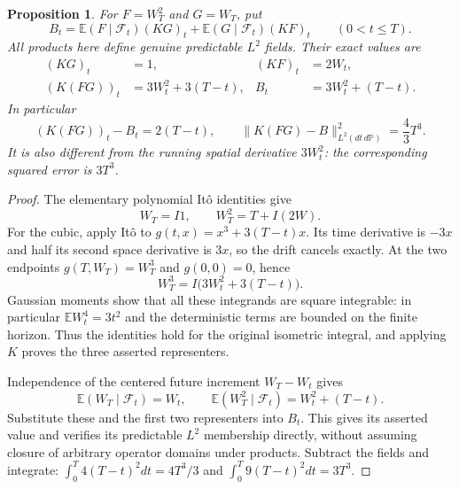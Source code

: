 \documentclass[11pt]{article}
\newtheorem{proposition}[theorem]{Proposition}
\newcommand{\E}{\mathbb E}
\begin{document}
\begin{proposition}\label{prop:conditionalleibniz}
For $F=W_T^2$ and $G=W_T$, put
\[
 B_t=\E(F\mid\mathcal F_t)(KG)_t
       +\E(G\mid\mathcal F_t)(KF)_t\qquad(0<t\leq T).
\]
All products here define genuine predictable $L^2$ fields. Their
exact values are
\begin{align}\label{eq:cubicleibniz}
 (KG)_t&=1,&(KF)_t&=2W_t,\\
 (K(FG))_t&=3W_t^2+3(T-t),& B_t&=3W_t^2+(T-t).
\end{align}
In particular
\begin{equation}\label{eq:cubicleibniznorm}
 (K(FG))_t-B_t=2(T-t),\qquad
 \|K(FG)-B\|_{L^2(dt\,d\mathbb P)}^2=\frac43T^3.
\end{equation}
It is also different from the running spatial derivative $3W_t^2$:
the corresponding squared error is $3T^3$.
\end{proposition}
\begin{proof}
The elementary polynomial It\^o identities give
\[
 W_T=I1,\qquad W_T^2=T+I(2W).
\]
For the cubic, apply It\^o to
$g(t,x)=x^3+3(T-t)x$. Its time derivative is $-3x$ and half its
second space derivative is $3x$, so the drift cancels exactly.
At the two endpoints $g(T,W_T)=W_T^3$ and $g(0,0)=0$, hence
\[
 W_T^3=I\big(3W_t^2+3(T-t)\big).
\]
Gaussian moments show that all these integrands are square
integrable: in particular $\E W_t^4=3t^2$ and the deterministic
terms are bounded on the finite horizon. Thus the identities hold
for the original isometric integral, and applying $K$ proves the
three asserted representers.

Independence of the centered future increment $W_T-W_t$ gives
\[
 \E(W_T\mid\mathcal F_t)=W_t,\qquad
 \E(W_T^2\mid\mathcal F_t)=W_t^2+(T-t).
\]
Substitute these and the first two representers into $B_t$.
This gives its asserted value and verifies its predictable
$L^2$ membership directly, without assuming closure of arbitrary
operator domains under products. Subtract the fields and integrate:
$\int_0^T4(T-t)^2dt=4T^3/3$ and
$\int_0^T9(T-t)^2dt=3T^3$.
\end{proof}
\end{document}
